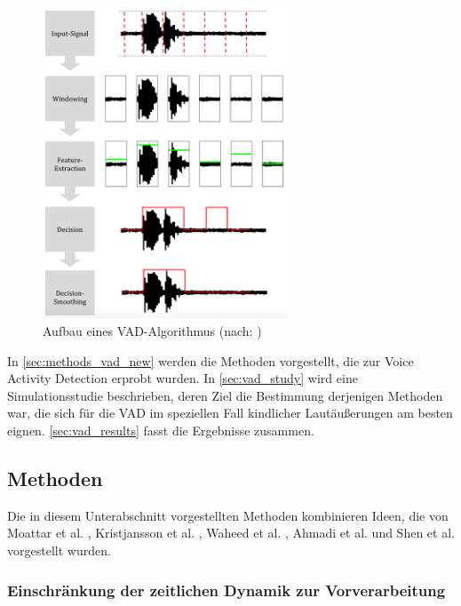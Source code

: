 \begin{figure}[h]
	\centering
	\includegraphics[width=0.65\textwidth]{bilder/vad_pipeline03.png}
	\caption[Aufbau eines VAD-Algorithmus]{Aufbau eines VAD-Algorithmus (nach: \cite[S. 8]{vad_granada})}
	\label{img:vad_pipeline}
\end{figure}


In \autoref{sec:methods_vad_new} werden die Methoden vorgestellt, die zur Voice Activity Detection erprobt wurden. In \autoref{sec:vad_study} wird eine Simulationsstudie beschrieben, deren Ziel die Bestimmung derjenigen Methoden war, die sich für die VAD im speziellen Fall kindlicher Lautäußerungen am besten eignen. \autoref{sec:vad_results} fasst die Ergebnisse zusammen.

\subsection{Methoden}
\label{sec:methods_vad_new}

Die in diesem Unterabschnitt vorgestellten Methoden kombinieren Ideen, die von Moattar et al. \cite{vad_Easy}, Kristjansson et al. \cite{vad_Lisboa}, Waheed et al. \cite{vad_entropy}, Ahmadi et al. \cite{vad_ceps} und Shen et al.\cite{vad_entropie02} vorgestellt wurden.

\subsubsection{Einschränkung der zeitlichen Dynamik zur Vorverarbeitung}
\label{sec:preprocessing}

